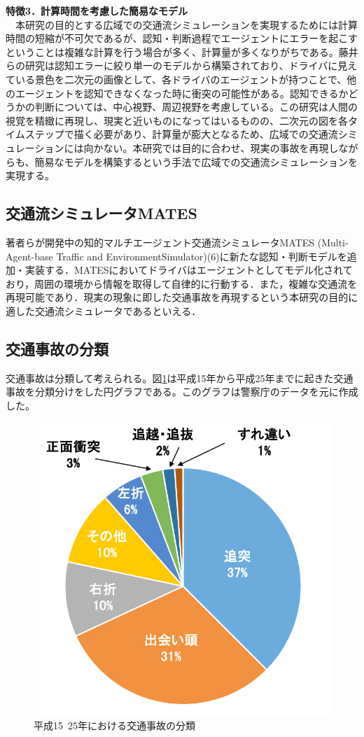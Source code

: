 \documentclass[14pt,a4j]{jsarticle}
\begin{document}
\textbf{特徴3．計算時間を考慮した簡易なモデル}\\
　本研究の目的とする広域での交通流シミュレーションを実現するためには計算時間の短縮が不可欠であるが、認知・判断過程でエージェントにエラーを起こすということは複雑な計算を行う場合が多く、計算量が多くなりがちである。藤井らの研究\cite{Fujii2011}は認知エラーに絞り単一のモデルから構築されており、ドライバに見えている景色を二次元の画像として、各ドライバのエージェントが持つことで、他のエージェントを認知できなくなった時に衝突の可能性がある。認知できるかどうかの判断については、中心視野、周辺視野を考慮している。この研究は人間の視覚を精緻に再現し、現実と近いものになってはいるものの、二次元の図を各タイムステップで描く必要があり、計算量が膨大となるため、広域での交通流シミュレーションには向かない。本研究では目的に合わせ、現実の事故を再現しながらも、簡易なモデルを構築するという手法で広域での交通流シミュレーションを実現する。

\newpage

\subsection{交通流シミュレータMATES}著者らが開発中の知的マルチエージェント交通流シミュレータMATES (Multi-Agent-base Traffic and EnvironmentSimulator)(6)に新たな認知・判断モデルを追加・実装する．MATESにおいてドライバはエージェントとしてモデル化されており，周囲の環境から情報を取得して自律的に行動する．また，複雑な交通流を再現可能であり．現実の現象に即した交通事故を再現するという本研究の目的に適した交通流シミュレータであるといえる．
\newpage
\subsection{交通事故の分類}
交通事故は分類して考えられる。図\ref{fig:accident-classification}は平成15年から平成25年までに起きた交通事故を分類分けをした円グラフである。このグラフは警察庁のデータ\cite{police2013}を元に作成した。
\begin{figure}[ht]
  \centering
  \includegraphics[width=0.5\hsize,bb=0 0 350 340]{./img/accident-classification.pdf} %
  \caption{平成15~25年における交通事故の分類}
  \label{fig:accident-classification}
\end{figure}
\end{document}
